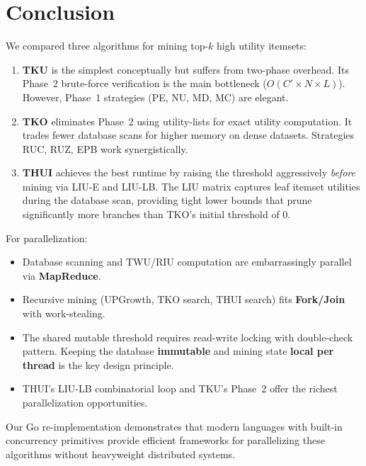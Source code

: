 \section{Conclusion}
\label{sec:conclusion}

We compared three algorithms for mining top-$k$ high utility itemsets:

\begin{enumerate}
    \item \textbf{TKU} is the simplest conceptually but suffers from two-phase overhead. Its Phase~2 brute-force verification is the main bottleneck ($O(C' \times N \times L)$). However, Phase~1 strategies (PE, NU, MD, MC) are elegant.

    \item \textbf{TKO} eliminates Phase~2 using utility-lists for exact utility computation. It trades fewer database scans for higher memory on dense datasets. Strategies RUC, RUZ, EPB work synergistically.

    \item \textbf{THUI} achieves the best runtime by raising the threshold aggressively \textit{before} mining via LIU-E and LIU-LB. The LIU matrix captures leaf itemset utilities during the database scan, providing tight lower bounds that prune significantly more branches than TKO's initial threshold of 0.
\end{enumerate}

For parallelization:
\begin{itemize}
    \item Database scanning and TWU/RIU computation are embarrassingly parallel via \textbf{MapReduce}.
    \item Recursive mining (UPGrowth, TKO search, THUI search) fits \textbf{Fork/Join} with work-stealing.
    \item The shared mutable threshold requires read-write locking with double-check pattern. Keeping the database \textbf{immutable} and mining state \textbf{local per thread} is the key design principle.
    \item THUI's LIU-LB combinatorial loop and TKU's Phase~2 offer the richest parallelization opportunities.
\end{itemize}

Our Go re-implementation demonstrates that modern languages with built-in concurrency primitives provide efficient frameworks for parallelizing these algorithms without heavyweight distributed systems.
